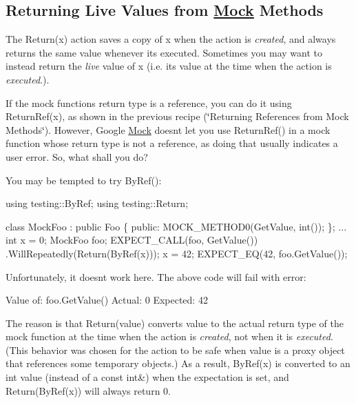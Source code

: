 \subsection*{Returning Live Values from \hyperlink{classMock}{Mock} Methods}

The {\ttfamily Return(x)} action saves a copy of {\ttfamily x} when the action is {\itshape created}, and always returns the same value whenever it\textquotesingle{}s executed. Sometimes you may want to instead return the {\itshape live} value of {\ttfamily x} (i.\+e. its value at the time when the action is {\itshape executed}.).

If the mock function\textquotesingle{}s return type is a reference, you can do it using {\ttfamily Return\+Ref(x)}, as shown in the previous recipe (\char`\"{}\+Returning References
from Mock Methods\char`\"{}). However, Google \hyperlink{classMock}{Mock} doesn\textquotesingle{}t let you use {\ttfamily Return\+Ref()} in a mock function whose return type is not a reference, as doing that usually indicates a user error. So, what shall you do?

You may be tempted to try {\ttfamily By\+Ref()}\+:


\begin{DoxyCode}
\textcolor{keyword}{using} testing::ByRef;
\textcolor{keyword}{using} testing::Return;

\textcolor{keyword}{class }MockFoo : \textcolor{keyword}{public} Foo \{
 \textcolor{keyword}{public}:
  MOCK\_METHOD0(GetValue, \textcolor{keywordtype}{int}());
\};
...
  \textcolor{keywordtype}{int} x = 0;
  MockFoo foo;
  EXPECT\_CALL(foo, GetValue())
      .WillRepeatedly(Return(ByRef(x)));
  x = 42;
  EXPECT\_EQ(42, foo.GetValue());
\end{DoxyCode}


Unfortunately, it doesn\textquotesingle{}t work here. The above code will fail with error\+:


\begin{DoxyCode}
Value of: foo.GetValue()
  Actual: 0
Expected: 42
\end{DoxyCode}


The reason is that {\ttfamily Return(value)} converts {\ttfamily value} to the actual return type of the mock function at the time when the action is {\itshape created}, not when it is {\itshape executed}. (This behavior was chosen for the action to be safe when {\ttfamily value} is a proxy object that references some temporary objects.) As a result, {\ttfamily By\+Ref(x)} is converted to an {\ttfamily int} value (instead of a {\ttfamily const int\&}) when the expectation is set, and {\ttfamily Return(\+By\+Ref(x))} will always return 0.

